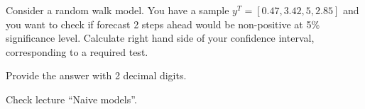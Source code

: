 
\begin{question}
Consider a random walk model. You have a sample \(y^T = [0.47, 3.42, 5, 2.85]\) and you want to check if forecast 2 steps ahead would be non-positive at 5\% significance level. Calculate right hand side of your confidence interval, corresponding to a required test.

Provide the answer with 2 decimal digits.
\end{question}

\begin{solution}
Check lecture ``Naive models''.
\end{solution}

